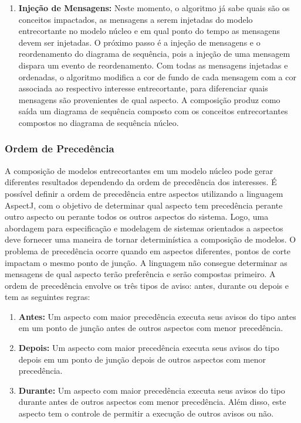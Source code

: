 \begin{itemize}
\begin{enumerate}
		  	\item \textbf{Injeção de Mensagens:} Neste momento, o algoritmo já sabe quais são os conceitos impactados, as mensagens a serem injetadas do
		  	modelo entrecortante no modelo núcleo e em qual ponto do tempo as mensagens devem ser injetadas. O próximo passo é a injeção de mensagens e o
		  	reordenamento do diagrama de sequência, pois a injeção de uma mensagem dispara um evento de reordenamento. Com todas as mensagens injetadas e
		  	ordenadas, o algoritmo modifica a cor de fundo de cada mensagem com a cor associada ao respectivo interesse entrecortante, para diferenciar quais
		  	mensagens são provenientes de qual aspecto. A composição produz como saída um diagrama de sequência composto com os conceitos entrecortantes
		  	compostos no diagrama de sequência núcleo.
		  
		  \end{enumerate}
		  
	  \end{itemize}  
	  
\subsubsection{Ordem de Precedência}

A composição de modelos entrecortantes em um modelo núcleo pode gerar diferentes resultados dependendo da ordem de precedência dos interesses. É
possível definir a ordem de precedência entre aspectos utilizando a linguagem AspectJ, com o objetivo de determinar qual aspecto tem precedência
perante outro aspecto ou perante todos os outros aspectos do sistema. Logo, uma abordagem para especificação e modelagem de sistemas orientados a
aspectos deve fornecer uma maneira de tornar determinística a composição de modelos. O problema de precedência ocorre quando em aspectos diferentes,
pontos de corte impactam o mesmo ponto de junção. A linguagem não consegue determinar as mensagens de qual aspecto terão preferência e serão compostas
primeiro. A ordem de precedência envolve os três tipos de aviso: antes, durante ou depois e tem as seguintes regras:

\begin{enumerate}
  \item \textbf{Antes:} Um aspecto com maior precedência executa seus avisos do tipo antes em um ponto de junção antes de outros aspectos com menor
  precedência.
  \item \textbf{Depois:} Um aspecto com maior precedência executa seus avisos do tipo depois em um ponto de junção depois de outros aspectos com menor
  precedência.
  \item \textbf{Durante:} Um aspecto com maior precedência executa seus avisos do tipo durante antes de outros aspectos com menor precedência. Além
  disso, este aspecto tem o controle de permitir a execução de outros avisos ou não.
\end{enumerate}


